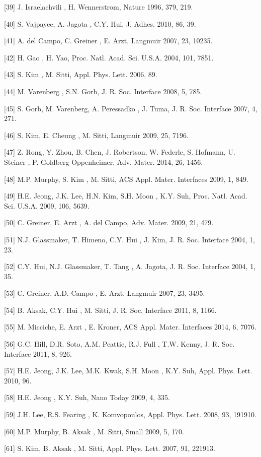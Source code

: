 [39]	J. Israelachvili , H. Wennerstrom, Nature 1996, 379, 219.

[40]	S. Vajpayee, A. Jagota , C.Y. Hui, J. Adhes. 2010, 86, 39.

[41]	A. del Campo, C. Greiner , E. Arzt, Langmuir 2007, 23, 10235.

[42]	H. Gao , H. Yao, Proc. Natl. Acad. Sci. U.S.A. 2004, 101, 7851.

[43]	S. Kim , M. Sitti, Appl. Phys. Lett. 2006, 89.

[44]	M. Varenberg , S.N. Gorb, J. R. Soc. Interface 2008, 5, 785.

[45]	S. Gorb, M. Varenberg, A. Peressadko , J. Tuma, J. R. Soc. Interface 2007, 4, 271.

[46]	S. Kim, E. Cheung , M. Sitti, Langmuir 2009, 25, 7196.

[47]	Z. Rong, Y. Zhou, B. Chen, J. Robertson, W. Federle, S. Hofmann, U. Steiner , P. Goldberg-Oppenheimer, Adv. Mater. 2014, 26, 1456.

[48]	M.P. Murphy, S. Kim , M. Sitti, ACS Appl. Mater. Interfaces 2009, 1, 849.

[49]	H.E. Jeong, J.K. Lee, H.N. Kim, S.H. Moon , K.Y. Suh, Proc. Natl. Acad. Sci. U.S.A. 2009, 106, 5639.

[50]	C. Greiner, E. Arzt , A. del Campo, Adv. Mater. 2009, 21, 479.

[51]	N.J. Glassmaker, T. Himeno, C.Y. Hui , J. Kim, J. R. Soc. Interface 2004, 1, 23.

[52]	C.Y. Hui, N.J. Glassmaker, T. Tang , A. Jagota, J. R. Soc. Interface 2004, 1, 35.

[53]	C. Greiner, A.D. Campo , E. Arzt, Langmuir 2007, 23, 3495.

[54]	B. Aksak, C.Y. Hui , M. Sitti, J. R. Soc. Interface 2011, 8, 1166.

[55]	M. Micciche, E. Arzt , E. Kroner, ACS Appl. Mater. Interfaces 2014, 6, 7076.

[56]	G.C. Hill, D.R. Soto, A.M. Peattie, R.J. Full , T.W. Kenny, J. R. Soc. Interface 2011, 8, 926.

[57]	H.E. Jeong, J.K. Lee, M.K. Kwak, S.H. Moon , K.Y. Suh, Appl. Phys. Lett. 2010, 96.

[58]	H.E. Jeong , K.Y. Suh, Nano Today 2009, 4, 335.

[59]	J.H. Lee, R.S. Fearing , K. Komvopoulos, Appl. Phys. Lett. 2008, 93, 191910.

[60]	M.P. Murphy, B. Aksak , M. Sitti, Small 2009, 5, 170.

[61]	S. Kim, B. Aksak , M. Sitti, Appl. Phys. Lett. 2007, 91, 221913.

